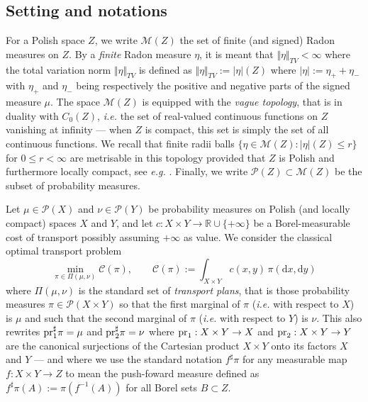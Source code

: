 \documentclass[leqno, 11pt, a4paper]{amsart}
\theoremstyle{definition}
\newcommand{\R}{\mathbb{R}}
\newcommand{\C}{\mathscr{C}}
\newcommand{\cP}{\mathcal{P}}
\newcommand{\cM}{\mathcal{M}}
\newcommand{\pr}{{\rm pr}}
\newcommand{\dd}{\mathrm{d}}
\newcommand{\extendedR}{\R \cup \{+\infty\}}
\begin{document}
\subsection{Setting and notations} 
For a Polish space $Z$, we write $\cM(Z)$ the set of finite (and signed) Radon measures on $Z$. By a \textit{finite} Radon measure $\eta$, it is meant that $\Vert \eta \Vert_{TV} < \infty$ where the total variation norm $\Vert \eta \Vert_{TV}$ is defined as $\Vert \eta \Vert_{TV} := |\eta|(Z)$ where $|\eta| := \eta_+ + \eta_-$ with $\eta_+$ and $\eta_-$ being respectively the positive and negative parts of the signed measure $\mu$. The space $\cM(Z)$ is equipped with the \textit{vague topology}, that is in duality with $C_0(Z)$, \textit{i.e.} the set of real-valued continuous functions on $Z$ vanishing at infinity --- when $Z$ is compact, this set is simply the set of all continuous functions. We recall that finite radii balls $\{ \eta \in \cM(Z): |\eta|(Z) \leq r\}$ for $0 \leq r < \infty$ are metrisable in this topology provided that $Z$ is Polish and furthermore locally compact, see \textit{e.g.} \cite[Theorem 3.29]{brezisFunctionalAnalysisSobolev2011}. Finally, we write $\cP(Z) \subset \cM(Z)$ be the subset of probability measures.

\medskip

Let $\mu \in \cP(X)$ and $\nu \in \cP(Y)$ be probability measures  on Polish (and locally compact) spaces $X$ and $Y$, and let  $c : X  \times Y \to \extendedR$ be a Borel-measurable cost of transport possibly assuming $+\infty$ as value. We consider the classical optimal transport problem 
\begin{equation}\label{OT}\tag{OT}
	\min_{\pi \in \Pi(\mu, \nu)}  \C(\pi), \qquad \C(\pi) :=  \int_{X \times Y} c(x, y)\, \pi(\dd x, \dd y)
\end{equation}
where $\Pi(\mu, \nu)$ is the standard set of \textit{transport plans}, that is those probability measures $\pi \in \cP(X \times Y)$ so that the first marginal of $\pi$ (\textit{i.e.} with respect to $X$) is $\mu$ and such that the second marginal of $\pi$ (\textit{i.e.} with respect to $Y$)  is $\nu$. This also rewrites $\pr_1^\sharp \pi = \mu$ and $\pr_2^\sharp \pi = \nu$ where $\pr_1 : X \times Y \to X$ and $\pr_2 : X \times Y \to Y$ are the canonical surjections of the Cartesian product $X \times Y$ onto its factors $X$ and $Y$ — and where we use the standard notation $f^\sharp \pi$ for any measurable map $f : X \times Y \to Z$  to mean the push-foward measure defined as $f^\sharp \pi(A) := \pi(f^{-1}(A))$ for all Borel sets $B \subset Z$.
\end{document}
